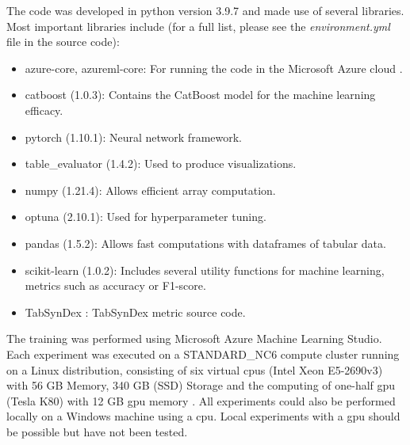 The code was developed in python version 3.9.7 and made use of several libraries.
Most important libraries include (for a full list, please see the \textit{environment.yml} file in the source code):
\begin{itemize}
	\item azure-core, azureml-core: For running the code in the Microsoft Azure cloud \cite{microsoft2023CloudComputingServices}.
	\item catboost (1.0.3): Contains the CatBoost \gls{model} for the machine learning efficacy.
	\item pytorch (1.10.1): Neural network framework.
	\item table\_evaluator (1.4.2): Used to produce visualizations.
	\item numpy (1.21.4): Allows efficient array computation.
	\item optuna (2.10.1): Used for hyperparameter tuning.
	\item pandas (1.5.2): Allows fast computations with dataframes of tabular data.
	\item scikit-learn (1.0.2): Includes several utility functions for machine learning, \eg metrics such as accuracy or F1-score.
	\item TabSynDex \cite{chundawat2022UniversalMetricRobust}: TabSynDex metric source code.
\end{itemize}

The training was performed using Microsoft Azure Machine Learning Studio.
Each experiment was executed on a STANDARD\_NC6 compute cluster running on a Linux distribution, consisting of six virtual \glspl{cpu} (Intel Xeon E5-2690v3) with 56 GB Memory, 340 GB (SSD) Storage and the computing of one-half \gls{gpu} (Tesla K80) with 12 GB \gls{gpu} memory \cite{vikancha-msft2022NCseriesAzureVirtual}.
All experiments could also be performed locally on a Windows machine using a \gls{cpu}.
Local experiments with a \gls{gpu} should be possible but have not been tested.

